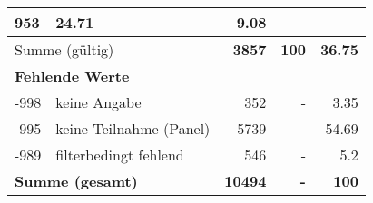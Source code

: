 \begin{longtable}{lXrrr}
       \num{953} &
       \num[round-mode=places,round-precision=2]{24,71} &
         \num[round-mode=places,round-precision=2]{9,08} \\
     \midrule
     \multicolumn{2}{l}{Summe (gültig)} &
       \textbf{\num{3857}} &
     \textbf{100} &
       \textbf{\num[round-mode=places,round-precision=2]{36,75}} \\
     \multicolumn{5}{l}{\textbf{Fehlende Werte}}\\
       -998 &
       keine Angabe &
         \num{352} &
        - &
         \num[round-mode=places,round-precision=2]{3,35} \\
       -995 &
       keine Teilnahme (Panel) &
         \num{5739} &
        - &
         \num[round-mode=places,round-precision=2]{54,69} \\
       -989 &
       filterbedingt fehlend &
         \num{546} &
        - &
         \num[round-mode=places,round-precision=2]{5,2} \\
     \midrule
     \multicolumn{2}{l}{\textbf{Summe (gesamt)}} &
          \textbf{\num{10494}} &
        \textbf{-} &
        \textbf{100} \\
     \bottomrule
     \end{longtable}
     
